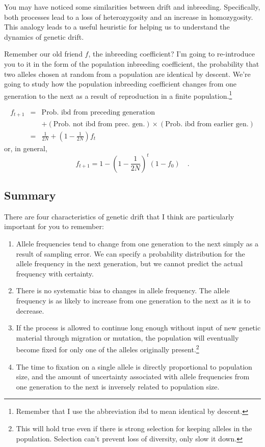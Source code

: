 \documentclass[12pt]{article}
\begin{document}
You may have noticed some similarities between drift and
inbreeding. Specifically, both processes lead to a loss of
heterozygosity and an increase in homozygosity. This analogy leads to
a useful heuristic for helping us to understand the dynamics of
genetic drift.

Remember our old friend $f$, the inbreeding coefficient? I'm going to
re-introduce you to it in the form of the population inbreeding
coefficient, the probability that two alleles chosen at random from a
population are identical by descent. We're going to study how the
population inbreeding coefficient changes from one generation to the
next as a result of reproduction in a finite
population.\footnote{Remember that I use the abbreviation ibd to mean
identical by descent.}

\begin{eqnarray*}
f_{t+1} &=& \mbox{Prob. ibd from preceding generation} \\
        &&  + (\mbox{Prob. not ibd from prec. gen.}) \times (\mbox{Prob. ibd from
          earlier gen.}) \\
   &=& \frac{1}{2N} + \left(1 - \frac{1}{2N}\right)f_t
\end{eqnarray*}
or, in general,
\[
f_{t+1} = 1 - \left(1 - \frac{1}{2N}\right)^t(1-f_0) \quad .
\]

\subsection*{Summary}

There are four characteristics of genetic drift that I think are
particularly important for you to remember:

\begin{enumerate}

\item Allele frequencies tend to change from one generation to the
next simply as a result of sampling error. We can specify a
probability distribution for the allele frequency in the next
generation, but we cannot predict the actual frequency with certainty.

\item There is no systematic bias to changes in allele frequency. The
allele frequency is as likely to increase from one generation to the
next as it is to decrease.

\item If the process is allowed to continue long enough without input
of new genetic material through migration or mutation, the population
will eventually become fixed for only one of the alleles originally
present.\footnote{This will hold true even if there is strong
selection for keeping alleles in the population. Selection can't
prevent loss of diversity, only slow it down.}

\item The time to fixation on a single allele is directly proportional
to population size, and the amount of uncertainty associated with
allele frequencies from one generation to the next is inversely
related to population size.

\end{enumerate}
\end{document}
